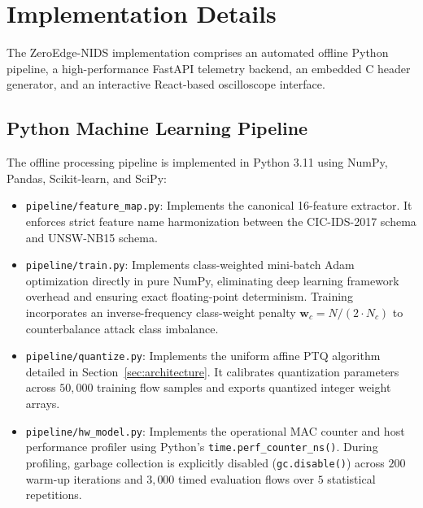 \section{Implementation Details}
\label{sec:implementation}

The ZeroEdge-NIDS implementation comprises an automated offline Python pipeline, a high-performance FastAPI telemetry backend, an embedded C header generator, and an interactive React-based oscilloscope interface.

\subsection{Python Machine Learning Pipeline}
The offline processing pipeline is implemented in Python 3.11 using NumPy, Pandas, Scikit-learn, and SciPy:
\begin{itemize}
    \item \texttt{pipeline/feature\_map.py}: Implements the canonical 16-feature extractor. It enforces strict feature name harmonization between the CIC-IDS-2017 schema and UNSW-NB15 schema.
    \item \texttt{pipeline/train.py}: Implements class-weighted mini-batch Adam optimization directly in pure NumPy, eliminating deep learning framework overhead and ensuring exact floating-point determinism. Training incorporates an inverse-frequency class-weight penalty $\mathbf{w}_c = N / (2 \cdot N_c)$ to counterbalance attack class imbalance.
    \item \texttt{pipeline/quantize.py}: Implements the uniform affine PTQ algorithm detailed in Section~\ref{sec:architecture}. It calibrates quantization parameters across $50,000$ training flow samples and exports quantized integer weight arrays.
    \item \texttt{pipeline/hw\_model.py}: Implements the operational MAC counter and host performance profiler using Python's \texttt{time.perf\_counter\_ns()}. During profiling, garbage collection is explicitly disabled (\texttt{gc.disable()}) across $200$ warm-up iterations and $3,000$ timed evaluation flows over $5$ statistical repetitions.
\end{itemize}

